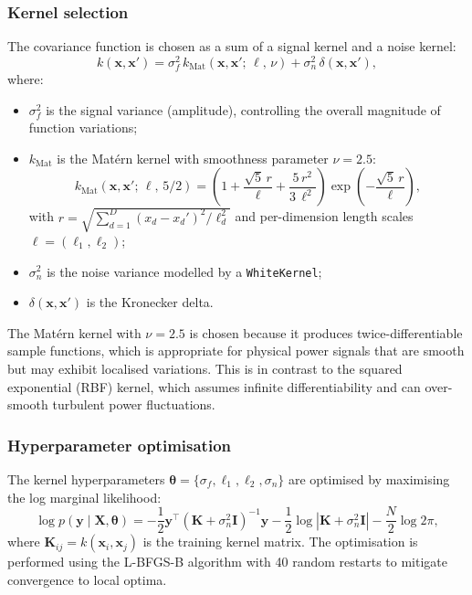 \documentclass[12pt]{article}
\newcommand{\abs}[1]{\left| #1 \right|}
\newcommand{\vect}[1]{\mathbf{#1}}
\newcommand{\mat}[1]{\mathbf{#1}}
\begin{document}
\subsubsection{Kernel selection}

The covariance function is chosen as a sum of a signal kernel and a noise kernel:
\begin{equation}
\label{eq:kernel}
    k(\vect{x}, \vect{x}') = \sigma_f^2 \, k_{\text{Mat}}(\vect{x}, \vect{x}';\, \boldsymbol{\ell},\, \nu) + \sigma_n^2 \, \delta(\vect{x}, \vect{x}'),
\end{equation}
where:
\begin{itemize}
    \item $\sigma_f^2$ is the signal variance (amplitude), controlling the overall magnitude of function variations;
    \item $k_{\text{Mat}}$ is the Mat\'{e}rn kernel with smoothness parameter $\nu = 2.5$:
    \begin{equation}
        k_{\text{Mat}}(\vect{x}, \vect{x}';\, \boldsymbol{\ell},\, 5/2) = \left(1 + \frac{\sqrt{5}\,r}{\ell} + \frac{5\,r^2}{3\,\ell^2}\right) \exp\!\left(-\frac{\sqrt{5}\,r}{\ell}\right),
    \end{equation}
    with $r = \sqrt{\sum_{d=1}^{D} (x_d - x_d')^2 / \ell_d^2}$ and per-dimension length scales $\boldsymbol{\ell} = (\ell_1, \ell_2)$;
    \item $\sigma_n^2$ is the noise variance modelled by a \texttt{WhiteKernel};
    \item $\delta(\vect{x}, \vect{x}')$ is the Kronecker delta.
\end{itemize}

The Mat\'{e}rn kernel with $\nu = 2.5$ is chosen because it produces twice-differentiable sample functions, which is appropriate for physical power signals that are smooth but may exhibit localised variations.
This is in contrast to the squared exponential (RBF) kernel, which assumes infinite differentiability and can over-smooth turbulent power fluctuations.

\subsubsection{Hyperparameter optimisation}

The kernel hyperparameters $\boldsymbol{\theta} = \{\sigma_f, \ell_1, \ell_2, \sigma_n\}$ are optimised by maximising the log marginal likelihood:
\begin{equation}
    \log p(\vect{y} \mid \mat{X}, \boldsymbol{\theta}) = -\frac{1}{2} \vect{y}^\top (\mat{K} + \sigma_n^2 \mat{I})^{-1} \vect{y} - \frac{1}{2} \log \abs{\mat{K} + \sigma_n^2 \mat{I}} - \frac{N}{2} \log 2\pi,
\end{equation}
where $\mat{K}_{ij} = k(\vect{x}_i, \vect{x}_j)$ is the training kernel matrix.
The optimisation is performed using the L-BFGS-B algorithm with 40 random restarts to mitigate convergence to local optima.
\end{document}
